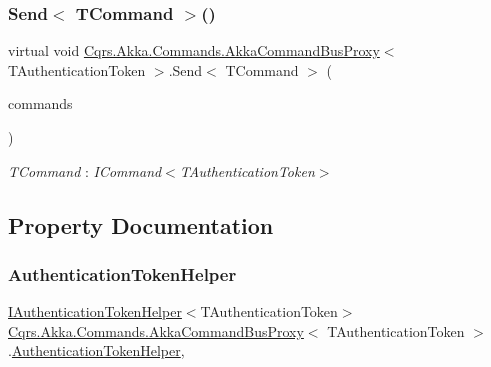\subsubsection{\texorpdfstring{Send$<$ T\+Command $>$()}{Send< TCommand >()}\hspace{0.1cm}{\footnotesize\ttfamily [2/2]}}
{\footnotesize\ttfamily virtual void \hyperlink{classCqrs_1_1Akka_1_1Commands_1_1AkkaCommandBusProxy}{Cqrs.\+Akka.\+Commands.\+Akka\+Command\+Bus\+Proxy}$<$ T\+Authentication\+Token $>$.Send$<$ T\+Command $>$ (\begin{DoxyParamCaption}\item[{I\+Enumerable$<$ T\+Command $>$}]{commands }\end{DoxyParamCaption})\hspace{0.3cm}{\ttfamily [virtual]}}

\begin{Desc}
\item[Type Constraints]\begin{description}
\item[{\em T\+Command} : {\em I\+Command$<$T\+Authentication\+Token$>$}]\end{description}
\end{Desc}


\subsection{Property Documentation}
\mbox{\label{classCqrs_1_1Akka_1_1Commands_1_1AkkaCommandBusProxy_a6faae6227f1da33928e54a775466f9c9_a6faae6227f1da33928e54a775466f9c9}} 
\subsubsection{\texorpdfstring{Authentication\+Token\+Helper}{AuthenticationTokenHelper}}
{\footnotesize\ttfamily \hyperlink{interfaceCqrs_1_1Authentication_1_1IAuthenticationTokenHelper}{I\+Authentication\+Token\+Helper}$<$T\+Authentication\+Token$>$ \hyperlink{classCqrs_1_1Akka_1_1Commands_1_1AkkaCommandBusProxy}{Cqrs.\+Akka.\+Commands.\+Akka\+Command\+Bus\+Proxy}$<$ T\+Authentication\+Token $>$.\hyperlink{classCqrs_1_1Authentication_1_1AuthenticationTokenHelper}{Authentication\+Token\+Helper}\hspace{0.3cm}{\ttfamily [get]}, {\ttfamily [protected]}}

